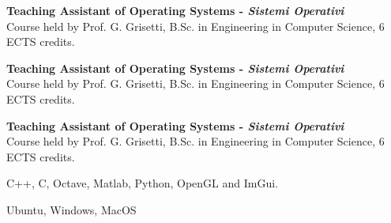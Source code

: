 \documentclass[a4paper,12pt]{memoir} %
\begin{document}
{\textbf{Teaching Assistant of Operating Systems - \textit{Sistemi Operativi}} 
  \\ Course held by Prof. G. Grisetti, B.Sc. in Engineering in Computer 
  Science, 
  6 ECTS credits.}

\Sep

{\textbf{Teaching Assistant of Operating Systems - \textit{Sistemi Operativi}} 
  \\ Course held by Prof. G. Grisetti, B.Sc. in Engineering in Computer 
  Science, 
  6 ECTS credits.}

\Sep

{\textbf{Teaching Assistant of Operating Systems - \textit{Sistemi Operativi}} 
  \\ Course held by Prof. G. Grisetti, B.Sc. in Engineering in Computer 
  Science, 6 ECTS credits.}

\Sep %
\Sep %




\Sep %
\Sep %


{C++, C, Octave, Matlab, Python, OpenGL and ImGui. }


{Ubuntu, Windows, MacOS}


\Sep %
\Sep %

\end{document}
